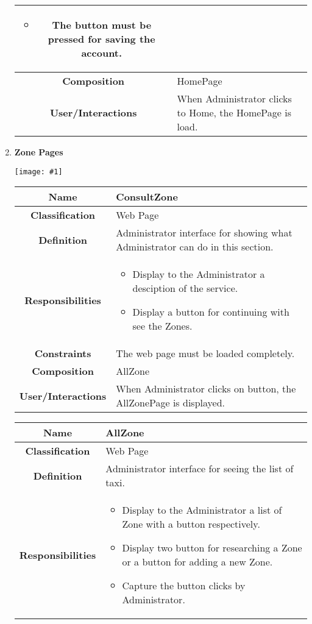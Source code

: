 \documentclass[11pt, a4paper,titlepage]{article}
\newcommand{\image}[1]{
	\begin{center}
		\noindent \texttt{[image: \#1]}
	\end{center}
	}
\begin{document}
\begin{enumerate}
\begin{tabularx}{\textwidth}{| c | X |}
\begin{itemize}
		\item The button must be pressed for saving the account.
	\end{itemize}
	\\
	\hline
	\textbf{Composition} & HomePage
	\\
	\hline
	\textbf{User/Interactions} & When Administrator clicks to Home, the HomePage is load.
	\\
	\hline 
\end{tabularx}
\newpage
\item \textbf{Zone Pages}\\
\image{page_zone.png}
\begin{tabularx}{\textwidth}{| c | X |}
	\hline
	\textbf{Name} &
	ConsultZone
	\\
	\hline
	\textbf{Classification} &
	Web Page
	\\
	\hline
	\textbf{Definition} &
	Administrator interface for showing what Administrator can do in this section.\\
	\hline
	\textbf{Responsibilities} &
	\begin{itemize}
		\item Display to the Administrator a desciption of the service.
		\item Display a button for continuing with see the Zones.
	\end{itemize}
	\\
	\hline
	\textbf{Constraints} & The web page must be loaded completely.
	\\
	\hline
	\textbf{Composition} &
	AllZone
	\\
	\hline
	\textbf{User/Interactions} &
	When Administrator clicks on button, the AllZonePage is displayed.
	\\
	\hline 
\end{tabularx}
\begin{tabularx}{\textwidth}{| c | X |}
	\hline
	\textbf{Name} &
	AllZone
	\\
	\hline
	\textbf{Classification} &
	Web Page
	\\
	\hline
	\textbf{Definition} &
	Administrator interface for seeing the list of taxi.\\
	\hline
	\textbf{Responsibilities} &
	\begin{itemize}
		\item Display to the Administrator a list of Zone with a button respectively.
		\item Display two button for researching a Zone or a button for adding a new Zone.
		\item  Capture the button clicks by Administrator.

\end{itemize}
\end{tabularx}
\end{enumerate}
\end{document}
